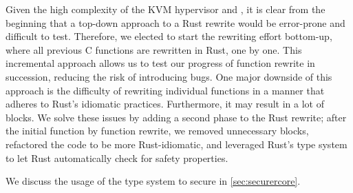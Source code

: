 %

Given the high complexity of the KVM hypervisor and \secore{},
it is clear from the beginning that
a top-down approach to a Rust rewrite would be error-prone and difficult to test.
Therefore, we elected to start the rewriting effort bottom-up,
where all previous C functions are rewritten in Rust, one by one.
This incremental approach allows us to test our progress of function rewrite in
succession, reducing the risk of introducing bugs.
One major downside of this approach is the difficulty of rewriting individual
functions in a manner that adheres to Rust's idiomatic practices.
Furthermore, it may result in a lot of  blocks.
We solve these issues by adding a second phase to the Rust rewrite;
after the initial function by function rewrite, we removed unnecessary
 blocks, refactored the code to be more Rust-idiomatic,
and leveraged Rust's type system to let Rust automatically check for safety
properties.

We discuss the usage of the type system to secure \rustcore{} in
\autoref{sec:securercore}.

